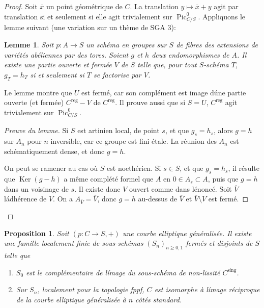 \documentclass{amsart}
\theoremstyle{plain}
\newtheorem{proposition}[theorem]{Proposition}
\newtheorem{lemma}[theorem]{Lemme}
\theoremstyle{remark}
\DeclareMathOperator{\Pic}{Pic}
\DeclareMathOperator{\Ker}{Ker}
\begin{document}
\begin{proof}
Soit $\overline{x}$ un point g\'eom\'etrique de $C$. La translation $y \mapsto \overline{x}+y$
agit par translation si et seulement si elle agit trivialement sur $\Pic^0_{C/S}$.
Appliquons le lemme suivant (une variation sur un th\`eme de SGA 3):

\begin{lemma}
Soit $p: A \to S$ un sch\'ema en groupes sur $S$ de fibres des extensions de vari\'et\'es
ab\'eliennes par des tores. Soient $g$ et $h$ deux endomorphismes de $A$. Il existe
une partie ouverte et ferm\'ee $V$ de $S$ telle que, pour tout $S$-sch\'ema $T$,
$g_T = h_T$ si et seulement si $T$ se factorise par $V$.
\end{lemma}

Le lemme montre que $U$ est ferm\'e, car son compl\'ement est image d\'une partie
ouverte (et ferm\'ee) $C^{\mathrm{reg}} - V$ de $C^{\mathrm{reg}}$. Il prouve aussi que si $S = U$,
$C^{\mathrm{reg}}$ agit trivialement sur $\Pic^0_{C/S}$.

\begin{proof}[Preuve du lemme]
Si $S$ est artinien local, de point $s$, et que $g_s = h_s$, alors $g = h$ sur $A_n$
pour $n$ inversible, car ce groupe est fini \'etale. La r\'eunion des $A_n$ est
sch\'ematiquement dense, et donc $g = h$.

On peut se ramener au cas o\`u $S$ est noeth\'erien. Si $s \in S$, et que $g_s = h_s$,
il r\'esulte que $\Ker(g-h)$ a m\^eme compl\'et\'e formel que $A$ en
$0 \in A_s \subset A$, puis que $g = h$ dans un voisinage de $s$. Il existe donc $V$
ouvert comme dans l\'enonc\'e. Soit $\overline{V}$ l\'adh\'erence de $V$. On a
$A_{\overline{V}} = \overline{V}$, donc $g = h$ au-dessus de $\overline{V}$ et
$\overline{V} \setminus V$ est ferm\'e.
\end{proof}
\end{proof}

\begin{proposition}
Soit $(p: C \to S, +)$ une courbe elliptique g\'en\'eralis\'ee. Il existe une famille
localement finie de sous-sch\'emas $(S_n)_{n \geq 0, 1}$ ferm\'es et disjoints de $S$ telle que
\begin{enumerate}
\item[(a)] $S_0$ est le compl\'ementaire de l\'image du sous-sch\'ema de non-lissit\'e
$C^{\mathrm{sing}}$.
\item[(b)] Sur $S_n$, localement pour la topologie \emph{fppf}, $C$ est isomorphe \`a
l\'image r\'eciproque de la courbe elliptique g\'en\'eralis\'ee \`a $n$ c\^ot\'es standard.
\end{enumerate}
\end{proposition}
\end{document}
